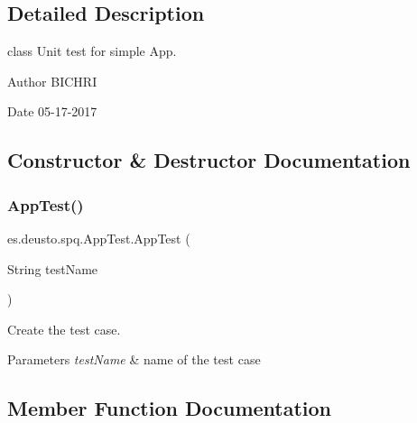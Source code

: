 \subsection{Detailed Description}
class Unit test for simple App. 

\begin{DoxyAuthor}{Author}
B\+I\+C\+H\+RI 
\end{DoxyAuthor}
\begin{DoxyDate}{Date}
05-\/17-\/2017 
\end{DoxyDate}


\subsection{Constructor \& Destructor Documentation}
\mbox{\label{classes_1_1deusto_1_1spq_1_1AppTest_a972284322afe0fcb22d82f0209af089a}} 
\subsubsection{\texorpdfstring{App\+Test()}{AppTest()}}
{\footnotesize\ttfamily es.\+deusto.\+spq.\+App\+Test.\+App\+Test (\begin{DoxyParamCaption}\item[{String}]{test\+Name }\end{DoxyParamCaption})}



Create the test case. 


\begin{DoxyParams}{Parameters}
{\em test\+Name} & name of the test case \\
\hline
\end{DoxyParams}


\subsection{Member Function Documentation}
\mbox{\label{classes_1_1deusto_1_1spq_1_1AppTest_ac59db16cf8210db66a8f053d62f455f8}} 
